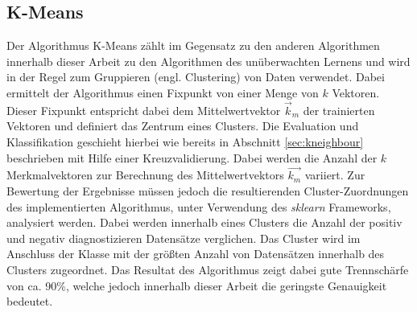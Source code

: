 \subsection{K-Means}
Der Algorithmus K-Means zählt im Gegensatz zu den anderen Algorithmen innerhalb dieser Arbeit zu den Algorithmen des unüberwachten Lernens und wird in der Regel zum Gruppieren (engl. \glqq Clustering\grqq) von Daten verwendet. Dabei ermittelt der Algorithmus einen Fixpunkt von einer Menge von $k$ Vektoren. Dieser Fixpunkt entspricht dabei dem Mittelwertvektor $\vec{k}_m$ der trainierten Vektoren und definiert das Zentrum eines Clusters.
Die Evaluation und Klassifikation geschieht hierbei wie bereits in Abschnitt \ref{sec:kneighbour} beschrieben mit Hilfe einer Kreuzvalidierung. Dabei werden die Anzahl der $k$ Merkmalvektoren zur Berechnung des Mittelwertvektors $\vec{k_m}$ variiert. 
Zur Bewertung der Ergebnisse müssen jedoch die resultierenden Cluster-Zuordnungen des implementierten Algorithmus, unter Verwendung des \textit{sklearn} Frameworks, analysiert werden. Dabei werden innerhalb eines Clusters die Anzahl der positiv und negativ diagnostizieren Datensätze verglichen. Das Cluster wird im Anschluss der Klasse mit der größten Anzahl von Datensätzen innerhalb des Clusters zugeordnet.
Das Resultat des Algorithmus zeigt dabei gute Trennschärfe von ca. 90\%, welche jedoch innerhalb dieser Arbeit die geringste Genauigkeit bedeutet.